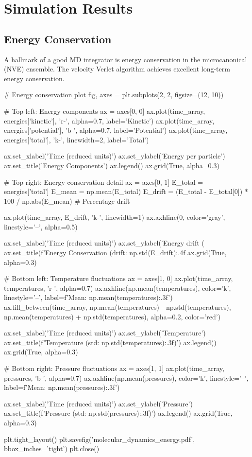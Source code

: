 \documentclass[11pt,a4paper]{article}
\begin{document}
\section{Simulation Results}

\subsection{Energy Conservation}

A hallmark of a good MD integrator is energy conservation in the microcanonical (NVE) ensemble. The velocity Verlet algorithm achieves excellent long-term energy conservation.

\begin{pycode}
# Energy conservation plot
fig, axes = plt.subplots(2, 2, figsize=(12, 10))

# Top left: Energy components
ax = axes[0, 0]
ax.plot(time_array, energies['kinetic'], 'r-', alpha=0.7, label='Kinetic')
ax.plot(time_array, energies['potential'], 'b-', alpha=0.7, label='Potential')
ax.plot(time_array, energies['total'], 'k-', linewidth=2, label='Total')

ax.set_xlabel('Time (reduced units)')
ax.set_ylabel('Energy per particle')
ax.set_title('Energy Components')
ax.legend()
ax.grid(True, alpha=0.3)

# Top right: Energy conservation detail
ax = axes[0, 1]
E_total = energies['total']
E_mean = np.mean(E_total)
E_drift = (E_total - E_total[0]) * 100 / np.abs(E_mean)  # Percentage drift

ax.plot(time_array, E_drift, 'k-', linewidth=1)
ax.axhline(0, color='gray', linestyle='--', alpha=0.5)

ax.set_xlabel('Time (reduced units)')
ax.set_ylabel('Energy drift (%
ax.set_title(f'Energy Conservation (drift: {np.std(E_drift):.4f}%
ax.grid(True, alpha=0.3)

# Bottom left: Temperature fluctuations
ax = axes[1, 0]
ax.plot(time_array, temperatures, 'r-', alpha=0.7)
ax.axhline(np.mean(temperatures), color='k', linestyle='--',
           label=f'Mean: {np.mean(temperatures):.3f}')
ax.fill_between(time_array,
                np.mean(temperatures) - np.std(temperatures),
                np.mean(temperatures) + np.std(temperatures),
                alpha=0.2, color='red')

ax.set_xlabel('Time (reduced units)')
ax.set_ylabel('Temperature')
ax.set_title(f'Temperature (std: {np.std(temperatures):.3f})')
ax.legend()
ax.grid(True, alpha=0.3)

# Bottom right: Pressure fluctuations
ax = axes[1, 1]
ax.plot(time_array, pressures, 'b-', alpha=0.7)
ax.axhline(np.mean(pressures), color='k', linestyle='--',
           label=f'Mean: {np.mean(pressures):.3f}')

ax.set_xlabel('Time (reduced units)')
ax.set_ylabel('Pressure')
ax.set_title(f'Pressure (std: {np.std(pressures):.3f})')
ax.legend()
ax.grid(True, alpha=0.3)

plt.tight_layout()
plt.savefig('molecular_dynamics_energy.pdf', bbox_inches='tight')
plt.close()
\end{pycode}
\end{document}

